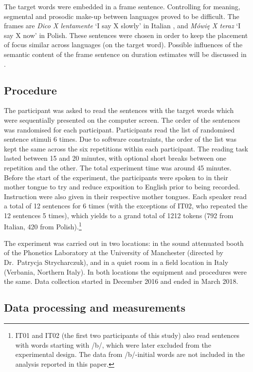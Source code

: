 \documentclass[12pt,]{article}
\let\rmarkdownfootnote\footnote%
\def\footnote{\protect\rmarkdownfootnote}
\begin{document}
The target words were embedded in a frame sentence. Controlling for
meaning, segmental and prosodic make-up between languages proved to be
difficult. The frames are \emph{Dico X lentamente} `I say X slowly' in
Italian \citep[following][]{hajek2008}, and \emph{Mówię X teraz} `I say
X now' in Polish. These sentences were chosen in order to keep the
placement of focus similar across languages (on the target word).
Possible influences of the semantic content of the frame sentence on
duration estimates will be discussed in .

\hypertarget{procedure}{%
\subsection{Procedure}\label{procedure}}

The participant was asked to read the sentences with the target words
which were sequentially presented on the computer screen. The order of
the sentences was randomised for each participant. Participants read the
list of randomised sentence stimuli 6 times. Due to software
constraints, the order of the list was kept the same across the six
repetitions within each participant. The reading task lasted between 15
and 20 minutes, with optional short breaks between one repetition and
the other. The total experiment time was around 45 minutes. Before the
start of the experiment, the participants were spoken to in their mother
tongue to try and reduce exposition to English prior to being recorded.
Instruction were also given in their respective mother tongues. Each
speaker read a total of 12 sentences for 6 times (with the exceptions of
IT02, who repeated the 12 sentences 5 times), which yields to a grand
total of 1212 tokens (792 from Italian, 420 from
Polish).\footnote{IT01 and IT02 (the first two participants of this study) also read sentences with words starting with /b/, which were later excluded from the experimental design. The data from /b/-initial words are not included in the analysis reported in this paper.}

The experiment was carried out in two locations: in the sound attenuated
booth of the Phonetics Laboratory at the University of Manchester
(directed by Dr.~Patrycja Strycharczuk), and in a quiet room in a field
location in Italy (Verbania, Northern Italy). In both locations the
equipment and procedures were the same. Data collection started in
December 2016 and ended in March 2018.

\hypertarget{data-processing-and-measurements}{%
\subsection{Data processing and
measurements}\label{data-processing-and-measurements}}
\end{document}
